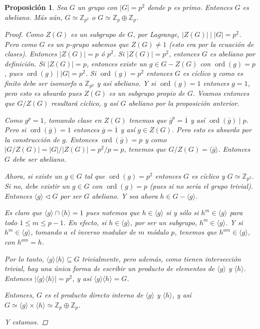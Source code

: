 \documentclass[12pt]{book}
\newtheorem{prop}[teo]{Proposición}
\theoremstyle{definition}
\newcommand{\ZZ}{\mathbb{Z}}      %
\DeclareMathOperator{\ord}{ord}
\begin{document}
\begin{prop}
Sea $G$ un grupo con $|G| = p^2$ donde $p$ es primo. Entonces $G$ es abeliano. Más aún, $G\simeq \mathbb{Z}_{p^2}$ o $G\simeq \mathbb{Z}_p\oplus \mathbb{Z}_p$.
\begin{proof}
Como $Z(G)$ es un subgrupo de $G$, por Lagrange, $|Z(G)|\mid |G|=p^2$. Pero como $G$ es un $p$-grupo sabemos que $Z(G)\neq 1$ (esto era por la ecuación de clases). Entonces $|Z(G)|=p$ ó $p^2$. Si $|Z(G)|=p^2$, entonces $G$ es abeliano por definición. Si $|Z(G)|=p$, entonces existe un $g\in G-Z(G)$ con $\ord (g) = p$, pues $\ord (g) \mid |G| = p^2$. Si $\ord(g) = p^2$ entonces $G$ es cíclico y como es finito debe ser isomorfo a $\ZZ_{p^2}$ y así abeliano. Y si $\ord(g)=1$ entonces $g=1$, pero esto es absurdo pues $Z(G)$ es un subgrupo propio de $G$. Veamos entonces que $G/Z(G)$ resultará cíclico, y así $G$ abeliano por la proposición anterior.

Como $g^p = 1$, tomando clase en $Z(G)$ tenemos que $\overline{g}^p = \overline{1}$ y así $\ord (\overline{g}) \mid p$. Pero si $\ord (\overline{g}) = 1$ entonces $\overline{g} =\overline{1}$ y así $g\in Z(G)$. Pero esto es absurdo por la construcción de $g$. Entonces $\ord (\overline{g})=p$ y como $|G/Z(G)| = |G|/|Z(G)| = p^2 / p = p$, tenemos que $G/Z(G) = \langle \overline{g} \rangle$. Entonces $G$ debe ser abeliano.

Ahora, si existe un $g\in G$ tal que $\ord (g)=p^2$ entonces $G$ es cíclico y $G\simeq \ZZ_{p^2}$. Si no, debe existir un $g\in G$ con $\ord (g)=p$ (pues si no sería el grupo trivial). Entonces $\langle g\rangle \triangleleft G$ por ser $G$ abeliano. Y sea ahora $h\in G-\langle g\rangle$. 

Es claro que $\langle g\rangle \cap \langle h\rangle = 1$ pues notemos que $h\in \langle g\rangle$ si y sólo si $h^m \in \langle g\rangle $ para todo $1\leq m\leq p-1$. En efecto, si $h\in \langle g\rangle$, por ser un subgrupo, $h^m \in \langle g\rangle$. Y si $h^m \in \langle g\rangle$, tomando $a$ el inverso modular de $m$ módulo $p$, tenemos que $h^{am} \in \langle g\rangle$, con $h^{am} = h$. 

Por lo tanto, $\langle g\rangle \langle h\rangle\subseteq G$ trivialmente, pero además, como tienen intersección trivial, hay una única forma de escribir un producto de elementos de $\langle g\rangle$ y $\langle h\rangle$. Entonces $|\langle g\rangle \langle h\rangle | = p^2$, y así $\langle g\rangle \langle h\rangle = G$.

Entonces, $G$ es el producto directo interno de $\langle g\rangle$ y $\langle h\rangle$, y así $G\simeq \langle g\rangle \times \langle h\rangle \simeq \ZZ_p\oplus\ZZ_p$. 

Y estamos.

\end{proof}
\end{prop}
\end{document}
